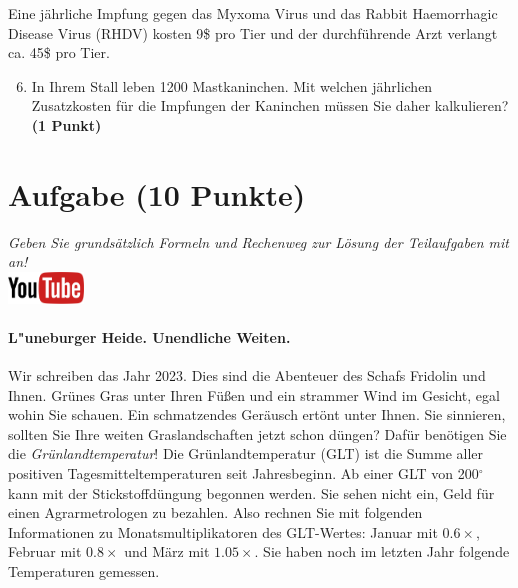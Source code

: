 \documentclass[a4paper, 10pt]{scrartcl}\usepackage[]{graphicx}\usepackage[]{xcolor}
\begin{document}
Eine j{\"a}hrliche Impfung gegen das Myxoma Virus und das Rabbit Haemorrhagic
Disease Virus (RHDV) kosten 9\$ pro Tier und der
durchf{\"u}hrende Arzt verlangt ca. 45\$ pro Tier.

\begin{enumerate}
  \setcounter{enumi}{5}
\item In Ihrem Stall leben 1200 Mastkaninchen. Mit welchen
  j{\"a}hrlichen Zusatzkosten f{\"u}r die Impfungen der Kaninchen m{\"u}ssen Sie daher
  kalkulieren? \textbf{(1 Punkt)}
\end{enumerate}
 
\clearpage

\section{Aufgabe \hfill (10 Punkte)}

\textit{Geben Sie grunds{\"a}tzlich Formeln und Rechenweg zur L{\"o}sung der
  Teilaufgaben mit an!} \\[1Ex]

\hfill\href{https://youtu.be/fiWGgCX-cE4}{\includegraphics[width =
  2cm]{img/youtube}} %
\hspace{2Ex}



\paragraph{L{"u}neburger Heide. Unendliche Weiten.}



Wir schreiben das Jahr 2023. Dies sind die Abenteuer
 des Schafs Fridolin und Ihnen. Gr{\"u}nes Gras unter Ihren F{\"u}{\ss}en und
ein strammer Wind im Gesicht, egal wohin Sie schauen. Ein schmatzendes
Ger{\"a}usch ert{\"o}nt unter Ihnen. Sie sinnieren, sollten Sie Ihre weiten
Graslandschaften jetzt schon d{\"u}ngen?  Daf{\"u}r ben{\"o}tigen Sie die
\textit{Gr{\"u}nlandtemperatur}! Die Gr{\"u}nlandtemperatur (GLT) ist die Summe aller
positiven Tagesmitteltemperaturen seit Jahresbeginn. Ab einer GLT von
200$^\circ$ kann mit der Stickstoffd{\"u}ngung begonnen werden. Sie sehen nicht
ein, Geld f{\"u}r einen Agrarmetrologen zu bezahlen. Also rechnen Sie mit
folgenden Informationen zu Monatsmultiplikatoren des GLT-Wertes: Januar mit
$0.6\times$, Februar mit $0.8\times$ und M{\"a}rz mit
$1.05\times$. Sie haben noch im letzten Jahr folgende Temperaturen
gemessen.
\end{document}
